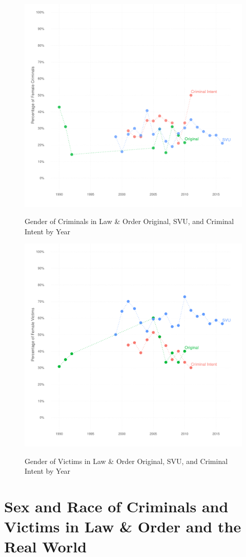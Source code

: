 \documentclass[12pt, letterpaper]{article}
\begin{document}
\begin{figure}[htbp]
\centering
\caption{Gender of Criminals in Law \& Order Original, SVU, and Criminal Intent by Year}
\includegraphics[scale=.9]{../figs/all_criminals_by_gender_ts.pdf}
\label{fig:perp_sex_ts}
\end{figure}

\begin{figure}[htbp]
\centering
\caption{Gender of Victims in Law \& Order Original, SVU, and Criminal Intent by Year}
\includegraphics[scale=.9]{../figs/all_victims_by_gender_ts.pdf}
\label{fig:victim_sex_ts}
\end{figure}

\clearpage
\section{Sex and Race of Criminals and Victims in Law \& Order and the Real World}
\label{si_tabs}



\clearpage


\clearpage


\clearpage

\end{document}
